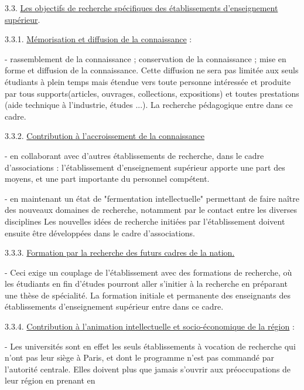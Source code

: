 
3.3. \uline{Les objectifs de recherche spécifiques des établissements d'enseignement supérieur}.

3.3.1. \uline{Mémorisation et diffusion de la connaissance} :

- rassemblement de la connaissance ; conservation de la connaissance ; mise en forme et diffusion de la connaissance. Cette diffusion ne sera pas limitée aux seuls étudiants à plein temps mais étendue vers toute personne intéressée et produite par tous supports(articles, ouvrages, collections, expositions) et toutes prestations (aide technique à l'industrie, études ...). La recherche pédagogique entre dans ce cadre.

3.3.2. \uline{Contribution à l'accroissement de la connaissance}

- en collaborant avec d'autres établissements de recherche, dans le cadre d'associations : l'établissement d'enseignement supérieur apporte une part des moyens, et une part importante du personnel compétent.

- en maintenant un état de "fermentation intellectuelle" permettant de faire naître des nouveaux domaines de recherche, notamment par le contact entre les diverses disciplines Les nouvelles idées de recherche\handwritten{,} initiées par l'établissement\handwritten{,} doivent\deleted{\unsure{,}} ensuite être développées dans le cadre d'associations.

3.3.3. \uline{Formation par la recherche des futurs cadres de la nation.}

- Ceci exige un couplage de l'établissement avec des formations de recherche, où les étudiants en fin d'études pourront aller s'initier à la recherche en préparant une thèse de spécialité. La formation initiale et permanente des enseignants des établissements d'enseignement supérieur entre dans ce cadre. \unsure{-}

3.3.4. \uline{Contribution à l'animation intellectuelle et socio-économique de la région} :

\margin{\unsure{-}}

- Les universités sont en effet les seuls établissements à vocation de recherche qui n'ont pas leur siège à Paris, et dont le programme n'est pas commandé par l'autorité centrale. Elles doivent plus que jamais s'ouvrir aux préoccupations de leur région en prenant en
